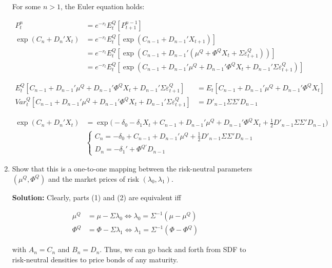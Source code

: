 \documentclass{article}
\begin{document}
\begin{enumerate}
For some $n>1$, the Euler equation holds:

\begin{align*}
P_t^n 
&= e^{-r_t} E_t^Q [P_{t+1}^{n-1}]\\
\exp(C_n + D_n'X_t)
&= e^{-r_t} E_t^Q [\exp(C_{n-1} + D_{n-1}'X_{t+1})]\\
&= e^{-r_t} E_t^Q [\exp(C_{n-1} + D_{n-1}'(\mu^Q + \Phi^Q X_t + \Sigma \varepsilon_{t+1}^Q))]\\
&= e^{-r_t} E_t^Q [\exp(C_{n-1} + D_{n-1}'\mu^Q + D_{n-1}'\Phi^Q X_t + D_{n-1}'\Sigma \varepsilon_{t+1}^Q)]
\end{align*}

\begin{align*}
E_t^Q[C_{n-1} + D_{n-1}'\mu^Q + D_{n-1}'\Phi^Q X_t + D_{n-1}'\Sigma \varepsilon_{t+1}^Q] 
&= E_t[C_{n-1} + D_{n-1}'\mu^Q + D_{n-1}'\Phi^Q X_t]\\
Var_t^Q [C_{n-1} + D_{n-1}'\mu^Q + D_{n-1}'\Phi^Q X_t + D_{n-1}'\Sigma \varepsilon_{t+1}^Q]
&= D'_{n-1} \Sigma \Sigma' D_{n-1}
\end{align*}

\begin{align*}
\exp(C_n + D_n'X_t)
&=  \exp \Bigg(-\delta_0 - \delta_1 X_t + C_{n-1} + D_{n-1}'\mu^Q + D_{n-1}'\Phi^Q X_t + \frac{1}{2} D'_{n-1} \Sigma \Sigma' D_{n-1} \Bigg)\\
& \begin{cases}
C_n = -\delta_0  + C_{n-1} + D_{n-1}'\mu^Q  + \frac{1}{2} D'_{n-1} \Sigma \Sigma' D_{n-1}\\
D_n = - \delta_1' + \Phi^{Q'} D_{n-1}
\end{cases}
\end{align*}

\item Show that this is a one-to-one mapping between the risk-neutral parameters $(\mu^Q,  \Phi^Q)$ and the market prices of risk $(\lambda_0, \lambda_1)$.

\bigskip

\textbf{Solution:} Clearly, parts (1) and (2) are equivalent iff

\begin{align*}
\mu^Q &= \mu - \Sigma \lambda_0  \iff \lambda_0 = \Sigma^{-1}(\mu - \mu^Q)\\
\Phi^Q &= \Phi - \Sigma \lambda_1 \iff \lambda_1 = \Sigma^{-1}(\Phi - \Phi^Q)
\end{align*}

with $A_n = C_n$ and $B_n = D_n$. Thus, we can go back and forth from SDF to risk-neutral densities to price bonds of any maturity.

\end{enumerate}
\end{document}
